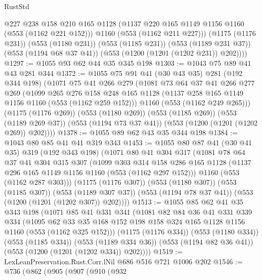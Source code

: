 \begin{lexlean}{RustStd}
\begin{coremodule}
          @227
          @238
          @158
          @210
          @165
          @1128
          (@1137 @220 @165 @1149 @1156 @1160 (@553 (@1162 @221 @152)))
          @1160
          (@553 (@1162 @211 @227)))
        (@1175 (@1176 @231))
        (@553 (@1180 @231))
        (@553 (@1185 @231))
        (@553 (@1189 @231 @37))
        (@553 (@1194 @68 @37 @41))
        (@553 (@1200 (@1201 (@1202 @231)) @202))))
@1297 := @1055 @93 @62 @44 @35 @345 @198
@1303 := @1043 @75 @89 @41 @43 @281 @344
@1372 := @1055
    @75
    @91
    @41
    (@30 @43 @35)
    @281
    (@192 @344 @198)
    (@1071
      @75
      @41
      @266
      @279
      (@1081
        @73
        @64
        @37
        @41
        @266
        @277
        @269
        (@1099
          @265
          @276
          @158
          @248
          @165
          @1128
          (@1137 @258 @165 @1149 @1156 @1160 (@553 (@1162 @259 @152)))
          @1160
          (@553 (@1162 @249 @265)))
        (@1175 (@1176 @269))
        (@553 (@1180 @269))
        (@553 (@1185 @269))
        (@553 (@1189 @269 @37))
        (@553 (@1194 @73 @37 @41))
        (@553 (@1200 (@1201 (@1202 @269)) @202))))
@1378 := @1055 @89 @62 @43 @35 @344 @198
@1384 := @1043 @80 @85 @41 @41 @319 @343
@1453 := @1055
    @80
    @87
    @41
    (@30 @41 @35)
    @319
    (@192 @343 @198)
    (@1071
      @80
      @41
      @304
      @317
      (@1081
        @78
        @64
        @37
        @41
        @304
        @315
        @307
        (@1099
          @303
          @314
          @158
          @286
          @165
          @1128
          (@1137 @296 @165 @1149 @1156 @1160 (@553 (@1162 @297 @152)))
          @1160
          (@553 (@1162 @287 @303)))
        (@1175 (@1176 @307))
        (@553 (@1180 @307))
        (@553 (@1185 @307))
        (@553 (@1189 @307 @37))
        (@553 (@1194 @78 @37 @41))
        (@553 (@1200 (@1201 (@1202 @307)) @202))))
@1513 := @1055
    @85
    @62
    @41
    @35
    @343
    @198
    (@1071
      @85
      @41
      @331
      @341
      (@1081
        @82
        @84
        @36
        @41
        @331
        @339
        @334
        (@1095 @62 @33 @35 @168 @152 @198 @158 @324 @165 @1128 @1156 @1160 (@553 (@1162 @325 @152)))
        (@1175 (@1176 @334))
        (@553 (@1180 @334))
        (@553 (@1185 @334))
        (@553 (@1189 @334 @36))
        (@553 (@1194 @82 @36 @41))
        (@553 (@1200 (@1201 (@1202 @334)) @202))))
@1519 := LexLeanPreservation.Rust.Corr.lNil @686 @516 @721 @1006 @202
@1546 := @736
    (@862
      (@905
        (@907
          (@910
            (@932

\end{coremodule}
\end{lexlean}
